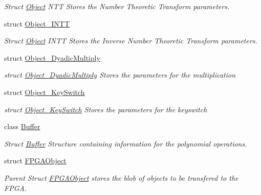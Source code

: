\begin{DoxyCompactItemize}
\begin{DoxyCompactList}\small\item\em Struct \hyperlink{structintel_1_1hexl_1_1fpga_1_1Object}{Object} N\-T\-T Stores the Number Theoretic Transform parameters. \end{DoxyCompactList}\item 
struct \hyperlink{structintel_1_1hexl_1_1fpga_1_1Object__INTT}{Object\-\_\-\-I\-N\-T\-T}
\begin{DoxyCompactList}\small\item\em Struct \hyperlink{structintel_1_1hexl_1_1fpga_1_1Object}{Object} I\-N\-T\-T Stores the Inverse Number Theoretic Transform parameters. \end{DoxyCompactList}\item 
struct \hyperlink{structintel_1_1hexl_1_1fpga_1_1Object__DyadicMultiply}{Object\-\_\-\-Dyadic\-Multiply}
\begin{DoxyCompactList}\small\item\em struct \hyperlink{structintel_1_1hexl_1_1fpga_1_1Object__DyadicMultiply}{Object\-\_\-\-Dyadic\-Multiply} Stores the parameters for the multiplication \end{DoxyCompactList}\item 
struct \hyperlink{structintel_1_1hexl_1_1fpga_1_1Object__KeySwitch}{Object\-\_\-\-Key\-Switch}
\begin{DoxyCompactList}\small\item\em struct \hyperlink{structintel_1_1hexl_1_1fpga_1_1Object__KeySwitch}{Object\-\_\-\-Key\-Switch} Stores the parameters for the keyswitch \end{DoxyCompactList}\item 
class \hyperlink{classintel_1_1hexl_1_1fpga_1_1Buffer}{Buffer}
\begin{DoxyCompactList}\small\item\em Struct \hyperlink{classintel_1_1hexl_1_1fpga_1_1Buffer}{Buffer} Structure containing information for the polynomial operations. \end{DoxyCompactList}\item 
struct \hyperlink{structintel_1_1hexl_1_1fpga_1_1FPGAObject}{F\-P\-G\-A\-Object}
\begin{DoxyCompactList}\small\item\em Parent Struct \hyperlink{structintel_1_1hexl_1_1fpga_1_1FPGAObject}{F\-P\-G\-A\-Object} stores the blob of objects to be transfered to the F\-P\-G\-A. \end{DoxyCompactList}\item 

\end{DoxyCompactItemize}
